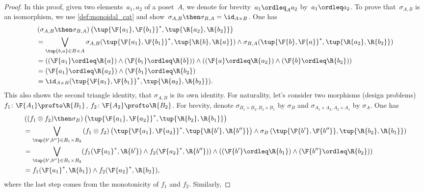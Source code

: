 \begin{proof}
  In this proof, given two elements~$a_1,a_2$ of a poset~$A$, we denote for brevity~$a_1 \ordleq_A a_2$ by~$a_1 \ordleq a_2$.
  To prove that~$\sigma_{A,B}$ is an isomorphism, we use \cref{def:monoidal_cat} and show~$\sigma_{A,B}\then \sigma_{B,A}=\id_{A\times B}$. One has
  \begin{equation}
    \begin{aligned}
      &\left( \sigma_{A,B}\then \sigma_{B,A}\right) \left( \tup{\F{a_1},\F{b_1}}^*,\tup{\R{a_2},\R{b_2}}\right)\\
      &=\bigvee_{\tup{b,a}\in B\times A}\sigma_{A,B}(\tup{\F{a_1},\F{b_1}}^*,\tup{\R{b},\R{a}})\wedge \sigma_{B,A}(\tup{\F{b},\F{a}}^*,\tup{\R{a_2},\R{b_2}})\\
      &=\left( (\F{a_1}\ordleq \R{a}) \wedge (\F{b_1}\ordleq \R{b})\right)\wedge \left((\F{a}\ordleq \R{a_2}) \wedge (\F{b}\ordleq \R{b_2})\right)\\
      &=(\F{a_1}\ordleq \R{a_2})\wedge (\F{b_1}\ordleq \R{b_2})\\
      &=\id_{A\times B}(\tup{\F{a_1},\F{b_1}}^*,\tup{\R{a_2},\R{b_2}}).
    \end{aligned}
  \end{equation}
  This also shows the second triangle identity, \ie  that $\sigma_{A,B}$ is its own identity.
  For naturality, let's consider two morphisms (design problems) $f_1\colon \F{A_1}\profto \R{B_1}$, $f_2\colon \F{A_2}\profto \R{B_2}$. For brevity, denote $\sigma_{B_1\times B_2,B_2\times B_1}$ by $\sigma_B$ and $\sigma_{A_1\times A_2,A_2\times A_1}$ by $\sigma_A$. One has
  \begin{equation}
    \begin{aligned}
      &\left((f_1\otimes f_2)\then \sigma_B \right)\left( \tup{\F{a_1},\F{a_2}}^*,\tup{\R{b_2},\R{b_1}}\right)\\
      &=\bigvee_{\tup{b',b''}\in B_1\times B_2} \left(f_1\otimes f_2\right) \left( \tup{\F{a_1},\F{a_2}}^*,\tup{\R{b'},\R{b''}}\right)\wedge \sigma_B\left(\tup{\F{b'},\F{b''}},\tup{\R{b_2},\R{b_1}} \right)\\
      &=\bigvee_{\tup{b',b''}\in B_1\times B_2}(f_1(\F{a_1}^*,\R{b'})\wedge f_2(\F{a_2}^*,\R{b''}))\wedge (\left(\F{b'}\ordleq \R{b_1}\right) \wedge \left(\F{b''}\ordleq \R{b_2}\right))\\
      &= f_1(\F{a_1}^*,\R{b_1}) \wedge f_2(\F{a_2}^*,\R{b_2}),
    \end{aligned}
  \end{equation}
  where the last step comes from the monotonicity of $f_1$ and $f_2$. Similarly,

\end{proof}
